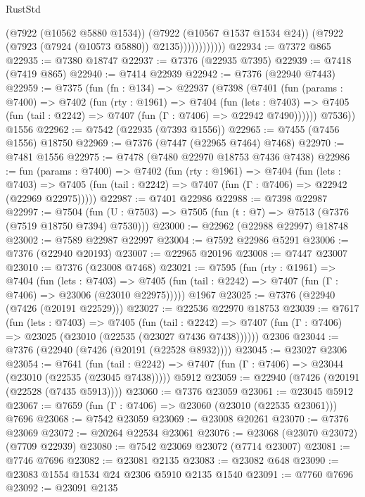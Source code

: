 \begin{lexlean}{RustStd}
\begin{coremodule}
                        (@7922 (@10562 @5880 @1534))
                        (@7922 (@10567 @1537 @1534 @24))
                        (@7922 (@7923 (@7924 (@10573 @5880)) @2135))))))))))))
@22934 := @7372 @865
@22935 := @7380 @18747
@22937 := @7376 (@22935 @7395)
@22939 := @7418 (@7419 @865)
@22940 := @7414 @22939
@22942 := @7376 (@22940 @7443)
@22959 := @7375
    (fun (fn : @134) =>
    @22937
      (@7398
        (@7401
          (fun (params : @7400) =>
          @7402
            (fun (rty : @1961) =>
            @7404
              (fun (lets : @7403) =>
              @7405 (fun (tail : @2242) => @7407 (fun (Γ : @7406) => @22942 @7490))))))
        @7536))
    @1556
@22962 := @7542 (@22935 (@7393 @1556))
@22965 := @7455 (@7456 @1556) @18750
@22969 := @7376 (@7447 (@22965 @7464) @7468)
@22970 := @7481 @1556
@22975 := @7478 (@7480 @22970 @18753 @7436 @7438)
@22986 := fun (params : @7400) =>
  @7402
    (fun (rty : @1961) =>
    @7404
      (fun (lets : @7403) =>
      @7405 (fun (tail : @2242) => @7407 (fun (Γ : @7406) => @22942 (@22969 @22975)))))
@22987 := @7401 @22986
@22988 := @7398 @22987
@22997 := @7504
    (fun (U : @7503) => @7505 (fun (t : @7) => @7513 (@7376 (@7519 @18750 @7394) @7530)))
@23000 := @22962 (@22988 @22997) @18748
@23002 := @7589 @22987 @22997
@23004 := @7592 @22986 @5291
@23006 := @7376 (@22940 @20193)
@23007 := @22965 @20196
@23008 := @7447 @23007
@23010 := @7376 (@23008 @7468)
@23021 := @7595
    (fun (rty : @1961) =>
    @7404
      (fun (lets : @7403) =>
      @7405 (fun (tail : @2242) => @7407 (fun (Γ : @7406) => @23006 (@23010 @22975)))))
    @1967
@23025 := @7376 (@22940 (@7426 (@20191 @22529)))
@23027 := @22536 @22970 @18753
@23039 := @7617
    (fun (lets : @7403) =>
    @7405
      (fun (tail : @2242) =>
      @7407 (fun (Γ : @7406) => @23025 (@23010 (@22535 (@23027 @7436 @7438))))))
    @2306
@23044 := @7376 (@22940 (@7426 (@20191 (@22528 @8932))))
@23045 := @23027 @2306
@23054 := @7641
    (fun (tail : @2242) => @7407 (fun (Γ : @7406) => @23044 (@23010 (@22535 (@23045 @7438)))))
    @5912
@23059 := @22940 (@7426 (@20191 (@22528 (@7435 @5913))))
@23060 := @7376 @23059
@23061 := @23045 @5912
@23067 := @7659 (fun (Γ : @7406) => @23060 (@23010 (@22535 @23061))) @7696
@23068 := @7542 @23059
@23069 := @23008 @20261
@23070 := @7376 @23069
@23072 := @20264 @22534 @23061
@23076 := @23068 (@23070 @23072) (@7709 @22939)
@23080 := @7542 @23069 @23072 (@7714 @23007)
@23081 := @7746 @7696
@23082 := @23081 @2135
@23083 := @23082 @648
@23090 := @23083 @1554 @1534 @24 @2306 @5910 @2135 @1540
@23091 := @7760 @7696
@23092 := @23091 @2135

\end{coremodule}
\end{lexlean}
